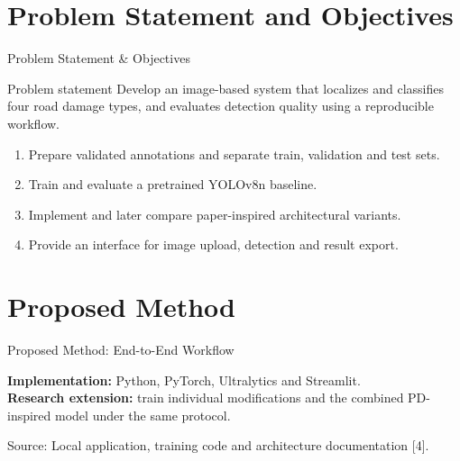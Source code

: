 \documentclass[aspectratio=169,11pt]{beamer}
\newcommand{\source}[1]{\par\vfill{\fontsize{7}{9}\selectfont\color{muted}Source: #1\par}}
\begin{document}
\section{Problem Statement and Objectives}
\begin{frame}{Problem Statement \& Objectives}
\begin{block}{Problem statement}
Develop an image-based system that localizes and classifies four road damage types, and evaluates detection quality using a reproducible workflow.
\end{block}
\medskip
\begin{enumerate}\setlength\itemsep{3mm}
\item Prepare validated annotations and separate train, validation and test sets.
\item Train and evaluate a pretrained YOLOv8n baseline.
\item Implement and later compare paper-inspired architectural variants.
\item Provide an interface for image upload, detection and result export.
\end{enumerate}
\end{frame}

\section{Proposed Method}
\begin{frame}{Proposed Method: End-to-End Workflow}
\centering
{}
\par\bigskip\raggedright
\textbf{Implementation:} Python, PyTorch, Ultralytics and Streamlit.\\[2mm]
\textbf{Research extension:} train individual modifications and the combined PD-inspired model under the same protocol.
\source{Local application, training code and architecture documentation [4].}
\end{frame}
\end{document}
